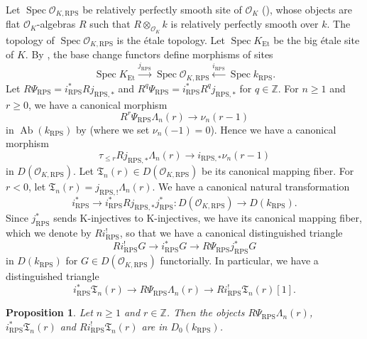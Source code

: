 \documentclass{amsart}
\newtheorem{Prop}[Thm]{Proposition}
\theoremstyle{remark}
\numberwithin{equation}{section}
\newcommand{\Order}{\mathcal{O}}
\newcommand{\tensor}{\mathbin{\otimes}}
\newcommand{\Z}{\mathbb{Z}}
\newcommand{\Et}{\mathrm{Et}}
\newcommand{\RPS}{\mathrm{RPS}}
\DeclareMathOperator{\Spec}{Spec}
\DeclareMathOperator{\Ab}{Ab}
\begin{document}
Let $\Spec \Order_{K, \RPS}$ be relatively perfectly smooth site of $\Order_{K}$
(\cite[Section 3]{KS19}),
whose objects are flat $\Order_{K}$-algebras $R$
such that $R \tensor_{\Order_{K}} k$ is relatively perfectly smooth over $k$.
The topology of $\Spec \Order_{K, \RPS}$ is the \'etale topology.
Let $\Spec K_{\Et}$ be the big \'etale site of $K$.
By \cite[Proposition 3.2, Equation (3.1)]{KS19},
the base change functors define morphisms of sites
	\[
			\Spec K_{\Et}
		\stackrel{j_{\RPS}}{\to}
			\Spec \Order_{K, \RPS}
		\stackrel{i_{\RPS}}{\gets}
			\Spec k_{\RPS}.
	\]
Let $R \Psi_{\RPS} = i_{\RPS}^{\ast} R j_{\RPS, \ast}$ and
$R^{q} \Psi_{\RPS} = i_{\RPS}^{\ast} R^{q} j_{\RPS, \ast}$ for $q \in \Z$.
For $n \ge 1$ and $r \ge 0$, we have a canonical morphism
	\[
			R^{r} \Psi_{\RPS} \Lambda_{n}(r)
		\to
			\nu_{n}(r - 1)
	\]
in $\Ab(k_{\RPS})$ by \cite[Proposition 5.1]{KS19}
(where we set $\nu_{n}(-1) = 0$).
Hence we have a canonical morphism
	\begin{equation} \label{0107}
			\tau_{\le r}
			R j_{\RPS, \ast} \Lambda_{n}(r)
		\to
			i_{\RPS, \ast} \nu_{n}(r - 1)
	\end{equation}
in $D(\Order_{K, \RPS})$.
Let $\mathfrak{T}_{n}(r) \in D(\Order_{K, \RPS})$ be its canonical mapping fiber.
For $r < 0$, let $\mathfrak{T}_{n}(r) = j_{\RPS, !} \Lambda_{n}(r)$.
We have a canonical natural transformation
	\[
			i_{\RPS}^{\ast} \to i_{\RPS}^{\ast} R j_{\RPS, \ast} j_{\RPS}^{\ast}
		\colon
			D(\Order_{K, \RPS})
		\to
			D(k_{\RPS}).
	\]
Since $j_{\RPS}^{\ast}$ sends K-injectives to K-injectives,
we have its canonical mapping fiber, which we denote by $R i_{\RPS}^{!}$,
so that we have a canonical distinguished triangle
	\[
			R i_{\RPS}^{!} G
		\to
			i_{\RPS}^{\ast} G
		\to
			R \Psi_{\RPS} j_{\RPS}^{\ast} G
	\]
in $D(k_{\RPS})$ for $G \in D(\Order_{K, \RPS})$ functorially.
In particular, we have a distinguished triangle
	\[
			i_{\RPS}^{\ast} \mathfrak{T}_{n}(r)
		\to
			R \Psi_{\RPS} \Lambda_{n}(r)
		\to
			R i_{\RPS}^{!} \mathfrak{T}_{n}(r)[1].
	\]

\begin{Prop} \label{0008}
	Let $n \ge 1$ and $r \in \Z$.
	Then the objects $R \Psi_{\RPS} \Lambda_{n}(r)$, $i_{\RPS}^{\ast} \mathfrak{T}_{n}(r)$ and
	$R i_{\RPS}^{!} \mathfrak{T}_{n}(r)$ are in $D_{0}(k_{\RPS})$.
\end{Prop}
\end{document}
